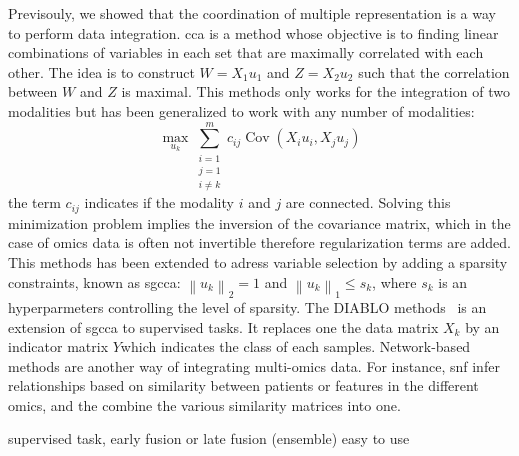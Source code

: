 \documentclass[../main.tex]{subfiles}
\begin{document}
		Previsouly, we showed that the coordination of multiple representation is a way to perform data integration. 
		\Gls{cca} is a method whose objective is to finding linear combinations of variables in each set that are maximally correlated with each other. 
		The idea is to construct \(W=X_1u_1\) and \(Z=X_2u_2\) such that the correlation between \(W\) and \(Z\) is maximal. 
		This methods only works for the integration of two modalities but has been generalized to work with any number of modalities: 
		\begin{equation}
			\max_{u_k} \sum_{\substack{i=1 \\ j=1 \\ i\neq k}}^{m} c_{ij}\operatorname{Cov}\left(X_iu_i,X_ju_j\right)
		\end{equation}
		the term \(c_{ij}\) indicates if the modality \(i\) and \(j\) are connected.  
		Solving this minimization problem implies the inversion of the covariance matrix, which in the case of omics data is often not invertible therefore regularization terms are added.  
		This methods has been extended to adress variable selection by adding a sparsity constraints, known as \gls{sgcca}: \({\left\|u_k \right\|}_2 = 1\) and \({\left\|u_k \right\|}_1 \leq s_k\), where \(s_k\) is an hyperparmeters controlling the level of sparsity. 
		The DIABLO methods~\cite{DIABLO} is an extension of \gls{sgcca} to supervised tasks. 
		It replaces one the data matrix \(X_k\) by an indicator matrix \(Y\)which indicates the class of each samples. 
		Network-based methods are another way of integrating multi-omics data.
		For instance, \gls{snf} infer relationships based on similarity between patients or features in the different omics, and the combine the various similarity matrices into one. 

		supervised task, early fusion or late fusion (ensemble) easy to use 

	
\end{document}
